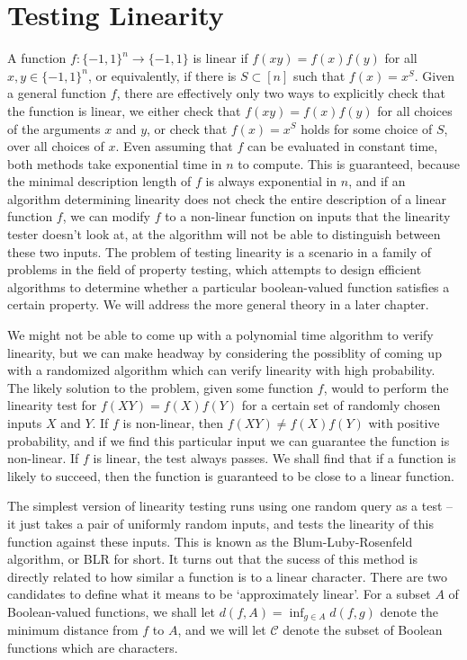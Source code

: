 \section{Testing Linearity}

A function $f: \{ -1, 1 \}^n \to \{ -1, 1 \}$ is linear if $f(xy) = f(x) f(y)$ for all $x,y \in \{ -1, 1 \}^n$, or equivalently, if there is $S \subset [n]$ such that $f(x) = x^S$. Given a general function $f$, there are effectively only two ways to explicitly check that the function is linear, we either check that $f(xy) = f(x) f(y)$ for all choices of the arguments $x$ and $y$, or check that $f(x) = x^S$ holds for some choice of $S$, over all choices of $x$. Even assuming that $f$ can be evaluated in constant time, both methods take exponential time in $n$ to compute. This is guaranteed, because the minimal description length of $f$ is always exponential in $n$, and if an algorithm determining linearity does not check the entire description of a linear function $f$, we can modify $f$ to a non-linear function on inputs that the linearity tester doesn't look at, at the algorithm will not be able to distinguish between these two inputs. The problem of testing linearity is a scenario in a family of problems in the field of property testing, which attempts to design efficient algorithms to determine whether a particular boolean-valued function satisfies a certain property. We will address the more general theory in a later chapter.

We might not be able to come up with a polynomial time algorithm to verify linearity, but we can make headway by considering the possiblity of coming up with a randomized algorithm which can verify linearity with high probability. The likely solution to the problem, given some function $f$, would to perform the linearity test for $f(XY) = f(X) f(Y)$ for a certain set of randomly chosen inputs $X$ and $Y$. If $f$ is non-linear, then $f(XY) \neq f(X) f(Y)$ with positive probability, and if we find this particular input we can guarantee the function is non-linear. If $f$ is linear, the test always passes. We shall find that if a function is likely to succeed, then the function is guaranteed to be close to a linear function.

The simplest version of linearity testing runs using one random query as a test -- it just takes a pair of uniformly random inputs, and tests the linearity of this function against these inputs. This is known as the Blum-Luby-Rosenfeld algorithm, or BLR for short. It turns out that the sucess of this method is directly related to how similar a function is to a linear character. There are two candidates to define what it means to be `approximately linear'. For a subset $A$ of Boolean-valued functions, we shall let $d(f,A) = \inf_{g \in A} d(f,g)$ denote the minimum distance from $f$ to $A$, and we will let $\mathcal{C}$ denote the subset of Boolean functions which are characters.

